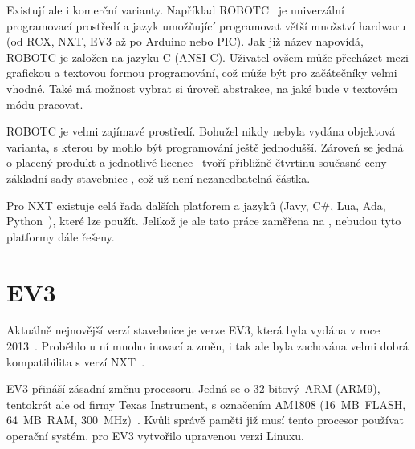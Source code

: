 Existují ale i komerční varianty. 
Například ROBOTC~\cite{legoProgramingPlatform_ROBOTC} je univerzální programovací prostředí a jazyk umožňující programovat větší množství hardwaru (od \legoM{ }RCX, NXT, EV3 až po Arduino nebo PIC). 
Jak již název napovídá, ROBOTC je založen na jazyku C (ANSI-C).
Uživatel ovšem může přecházet mezi grafickou a textovou formou programování, což může být pro začátečníky velmi vhodné.
Také má možnost vybrat si úroveň abstrakce, na jaké bude v textovém módu pracovat.  

ROBOTC je velmi zajímavé prostředí. Bohužel nikdy nebyla vydána objektová varianta, s kterou by mohlo být programování ještě jednodušší. 
Zároveň se jedná o placený produkt a jednotlivé licence~\cite{legoProgramingPlatform_ROBOTC-price} tvoří přibližně čtvrtinu současné ceny základní sady stavebnice \legoEV{~}\cite{lego_eduxeEshop_CoreSet}, což už není nezanedbatelná částka.

Pro NXT existuje celá řada dalších platforem a jazyků (Javy, C\#, Lua, Ada, Python~\cite{legoMindstormsNXT_Programming}), které lze použít. 
Jelikož je ale tato práce zaměřena na \legoEV{ }, nebudou tyto platformy dále řešeny. 

\section{\legoM{ }EV3}

Aktuálně nejnovější verzí stavebnice \legoM{ }je verze EV3, která byla vydána v roce 2013~\cite{lego_mindstormsHistory}. 
Proběhlo u ní mnoho inovací a změn, i tak ale byla zachována velmi dobrá kompatibilita s verzí NXT~\cite{legoRobotSquare_EV3-and-NXT-compatibility}.

EV3 přináší zásadní změnu procesoru. 
Jedná se o 32-bitový~ARM (ARM9), tentokrát ale od firmy Texas Instrument, s označením AM1808 (16~MB~FLASH, 64~MB~RAM, 300~MHz)~\cite{legoMindstormsEV3_fw-dev-kit}. 
Kvůli správě paměti již musí tento procesor používat operační systém. %
\lego{ }pro EV3 vytvořilo upravenou verzi Linuxu. 

